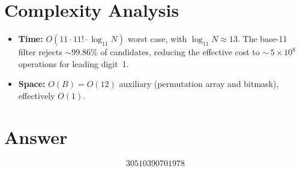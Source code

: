 \documentclass[12pt]{article}
\begin{document}
\section{Complexity Analysis}

\begin{itemize}
    \item \textbf{Time:} $O(11 \cdot 11! \cdot \log_{11} N)$ worst case, with $\log_{11} N \approx 13$. The base-11 filter rejects $\sim 99.86\%$ of candidates, reducing the effective cost to ${\sim}\, 5 \times 10^8$ operations for leading digit~1.
    \item \textbf{Space:} $O(B) = O(12)$ auxiliary (permutation array and bitmask), effectively $O(1)$.
\end{itemize}

\section{Answer}

\[
\boxed{30510390701978}
\]
\end{document}
